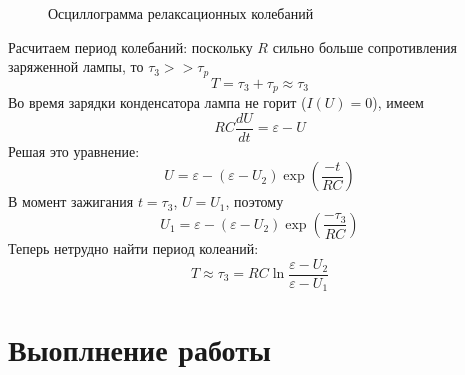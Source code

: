 \documentclass[a4paper,12pt]{article}
\begin{document}
\begin{figure}[h]
\caption{Осциллограмма релаксационных колебаний}
\label{fig:oscillogramm}
\end{figure}
Расчитаем период колебаний: поскольку $R$ сильно больше сопротивления заряженной лампы, то $\tau_3 >> \tau_p$
$$
T = \tau_3 + \tau_p \approx \tau_3
$$
Во время зарядки конденсатора лампа не горит ($I(U) = 0$), имеем
$$
RC\frac{dU}{dt} = \varepsilon - U
$$
Решая это уравнение:
$$
U = \varepsilon - (\varepsilon - U_2)\exp(\frac{-t}{RC})
$$
В момент зажигания $t = \tau_3$, $U = U_1$, поэтому
$$
U_1 = \varepsilon - (\varepsilon - U_2)\exp(\frac{-\tau_3}{RC})
$$
Теперь нетрудно найти период колеаний:
$$
T \approx \tau_3 = RC\ln\frac{\varepsilon - U_2}{\varepsilon - U_1}
$$
\section{Выоплнение работы}
\end{document}
